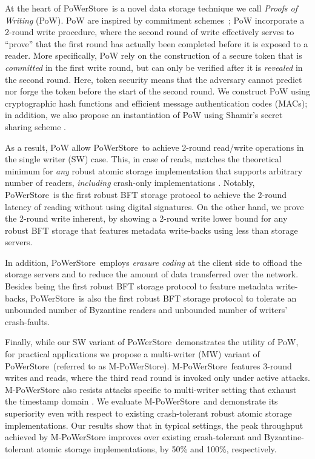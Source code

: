 \documentclass[10pt,conference,compsocconf]{IEEEtran}
\newcommand{\protocol}{PoWerStore}
\newcommand{\mprotocol}{M-PoWerStore}
\begin{document}
At the heart of \protocol\ is a novel data storage technique we call \emph{Proofs of Writing} (PoW). PoW are inspired by commitment schemes~\cite{Halevi1996};  PoW incorporate a 2-round write procedure, where the second round of write effectively serves to ``prove'' that the first round has actually been completed before it is exposed to a reader.
More specifically, PoW rely on the construction of a secure token that is \emph{committed} in the first write round, but can
only be verified after it is \emph{revealed} in the second round. Here, token security means that the adversary cannot predict nor forge the token
before the start of the second round. We construct PoW using cryptographic hash functions and efficient message authentication codes (MACs); in addition, we also propose an instantiation of PoW using
Shamir's secret sharing scheme \cite{Sha79}.

As a result, PoW allow \protocol\ to achieve 2-round read/write operations in the single writer (SW) case. This, in case of reads, matches the theoretical minimum for \emph{any} robust atomic storage implementation that supports arbitrary number of readers, \emph{including} crash-only implementations \cite{DGLV10}. Notably, \protocol\ is the first robust BFT storage protocol to achieve the 2-round latency of reading without using digital signatures.
On the other hand, we prove the 2-round write inherent, by showing a 2-round write lower bound for any robust BFT storage that features metadata write-backs using less than  storage servers.



In addition, \protocol\ employs \emph{erasure coding} at the client side to offload the storage servers and to reduce the amount of data transferred over the network. Besides being the first robust BFT storage protocol to feature metadata write-backs, \protocol\ is also the first robust BFT storage protocol to tolerate an unbounded number of Byzantine readers \cite{LR06} and unbounded number of writers' crash-faults.

Finally, while our SW variant of \protocol\ demonstrates the utility of PoW, for practical applications we propose a multi-writer (MW) variant of \protocol\ (referred to as \mprotocol). \mprotocol\ features 3-round writes and reads, where the third read round is invoked only under active attacks. \mprotocol{} also resists attacks specific to multi-writer setting that exhaust
the timestamp domain \cite{BD04}. We evaluate \mprotocol\ and demonstrate its superiority even with respect to existing crash-tolerant robust atomic storage implementations. Our results show that in typical settings, the peak throughput achieved by \mprotocol{} improves over existing crash-tolerant \cite{ABND95} and Byzantine-tolerant \cite{Phalanx} atomic storage implementations, by 50\% and 100\%, respectively.
\end{document}
